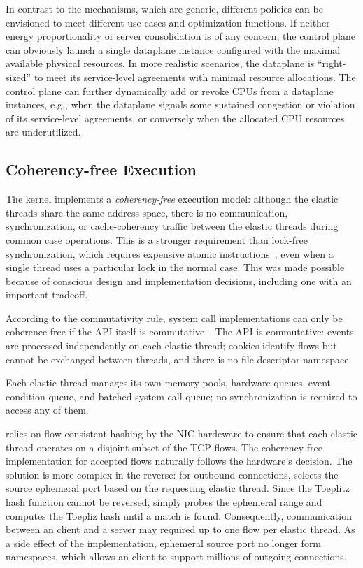 In contrast to the mechanisms, which are generic, different policies
can be envisioned to meet different use cases and optimization
functions.  If neither energy proportionality or server consolidation
is of any concern, the control plane can obviously launch a single
dataplane instance configured with the maximal available physical
resources.  In more realistic scenarios, the dataplane is
``right-sized'' to meet its service-level agreements with minimal
resource allocations.  The control plane can further dynamically add
or revoke CPUs from a dataplane instances, e.g., when the dataplane
signals some sustained congestion or violation of its service-level
agreements, or conversely when the allocated CPU resources are
underutilized.

\subsection{Coherency-free Execution}
\label{sec:impl:cohfree}

The \ix kernel implements a \emph{coherency-free} execution model:
although the elastic threads share the same address space, there is no
communication, synchronization, or cache-coherency traffic between the
elastic threads during common case operations.  This is a stronger
requirement than lock-free synchronization, which requires expensive
atomic instructions~\cite{DBLP:conf/sosp/DavidGT13}, even when a single thread uses a
particular lock in the normal case.  This was made possible because of
conscious design and implementation decisions, including one with an
important tradeoff.

 According to the commutativity rule,
system call implementations can only be coherence-free if the API
itself is commutative~\cite{DBLP:conf/sosp/ClementsKZMK13}.  The \ix
API is commutative: events are processed independently on each elastic
thread; cookies identify flows but cannot be exchanged between
threads, and there is no file descriptor namespace.


 Each elastic thread manages its own
memory pools, hardware queues, event condition queue, and batched
system call queue; no synchronization is required to access any of
them.

 \ix relies on flow-consistent
hashing by the NIC hardeware to ensure that each elastic thread
operates on a disjoint subset of the TCP flows.  The coherency-free
implementation for accepted flows naturally follows the hardware's
decision.  The solution is more complex in the reverse: for outbound
connections, \ix selects the source ephemeral port based on the
requesting elastic thread. Since the Toeplitz hash function cannot be
reversed, \ix simply probes the ephemeral range and computes the
Toepliz hash until a match is found.  Consequently, communication
between an \ix client and a server may required up to one flow per
elastic thread.  As a side effect of the implementation, ephemeral
source port no longer form namespaces, which allows an \ix client to
support millions of outgoing connections.

